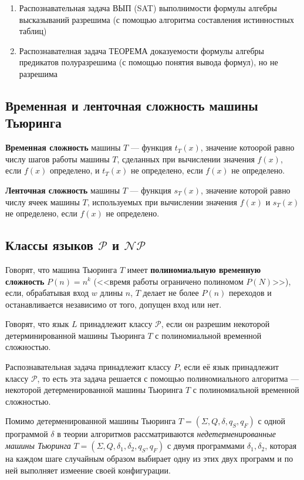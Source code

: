 \begin{enumerate}
    \item Распознавательная задача ВЫП (SAT) выполнимости формулы алгебры высказываний разрешима (с помощью алгоритма составления истинностных таблиц)
    \item Распознавателная задача ТЕОРЕМА доказуемости формулы алгебры предикатов полуразрешима (с помощью понятия вывода формул), но не разрешима
\end{enumerate}

\subsection{Временная и ленточная сложность машины Тьюринга}
\dftion \textbf{Временная сложность} машины $T$ --- функция $t_T(x)$, значение котоорой равно числу шагов работы машины $T$, сделанных при вычислении значения $f(x)$, если $f(x)$ определено, и $t_T(x)$ не определено, если $f(x)$ не определено.

\dftion \textbf{Ленточная сложность} машины $T$ --- функция $s_T(x)$, значение которой равно числу ячеек машины $T$, используемых при вычислении значения $f(x)$ и $s_T(x)$ не определено, если $f(x)$ не определено.

\subsection{Классы языков $\mathscr{P}$ и $\mathscr{NP}$}

Говорят, что машина Тьюринга $T$ имеет \textbf{полиномиальную временную сложность} $P(n)=n^k$ (<<время работы ограничено полиномом $P(N)$>>), если, обрабатывая вход $w$ длины $n$, $T$ делает не более $P(n)$ переходов и останавливается независимо от того, допущен вход или нет.

\dftion Говорят, что язык $L$ принадлежит классу $\mathscr{P}$, если он разрешим некоторой детерминированной машины Тьюринга $T$ с полиномиальной временной сложностью.

\dftion Распознавательная задача принадлежит классу $P$, если её язык принадлежит классу $\mathscr{P}$, то есть эта задача решается с помощью полиномиального алгоритма --- некоторой детерменированной машины Тьюринга $T$ с полиномиальной временной сложностью.

Помимо детерменированной машины Тьюринга $T=(\Sigma, Q, \delta, q_S, q_F)$ с одной программой $\delta$ в теории алгоритмов рассматриваются \textit{недетерменированные машины Тьюринга} $T=(\Sigma, Q, \delta_1, \delta_2, q_S, q_F)$ с двумя программами $\delta_1, \delta_2$, которая на каждом шаге случайным образом выбирает одну из этих двух программ и по ней выполняет измеение своей конфигурации.

